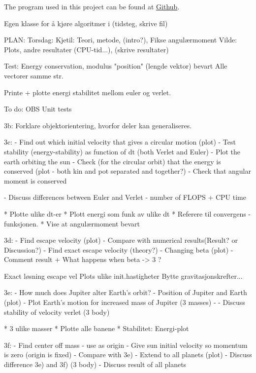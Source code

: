 


The program used in this project can be found at \href{https://github.com/kjetka/Project3}{Github}. 

  Egen klasse for å kjøre algoritmer i (tidsteg, skrive fil) 
     
PLAN:  
Torsdag: 
  Kjetil: Teori, metode, (intro?), Fikse angulærmoment 
  Vilde: Plots, andre resultater (CPU-tid...),  (skrive resultater)



Test: 		
Energy conservation, modulus "position" (lengde vektor) bevart
				Alle vectorer samme str.



	Printe + plotte energi stabilitet mellom euler og verlet.


To do:
	OBS Unit tests
	
	3b:
								Forklare objektorientering, hvorfor deler kan generaliseres. 
	
	3c: 					  
	- Find out which initial velocity that gives a circular motion (plot)
	- Test stability (energy-stability) as function of dt (both Verlet and Euler)
	- Plot the earth orbiting the sun
	- Check (for the circular orbit) that the energy is conserved (plot - both kin and pot separated and together?)
	- Check that angular moment is conserved
	
	- Discuss differences between Euler and Verlet
		- number of FLOPS + CPU time
	
	
 * Plotte ulike dt-er
 * Plott energi som funk av ulike dt
 * Referere til convergens - funksjonen.
 * Vise at angulærmoment bevart

	3d: 	
	- Find escape velocity (plot)
	 	- Compare with numerical results(Result? or Discussion?)
	- Find exact escape velocity (theory?)
	- Changing beta (plot)
		- Comment result + What happens when beta -> 3 ?
	
					  Exact løsning escape vel
								Plots ulike init.hastigheter
								Bytte gravitasjonskrefter... 
								
	3e:
	- How much does Jupiter alter Earth's orbit?
	- Position of Jupiter and Earth (plot)	
	- Plot Earth's motion for increased mass of Jupiter (3 masses)
	- 
	- Discuss stability of velocity verlet (3 body)

 * 3 ulike masser
 * Plotte alle banene
 * Stabilitet: Energi-plot

	3f:
	- Find center off mass - use as origin
	- Give sun initial velocity so momentum is zero (origin is fixed)
	- Compare with 3e)
	- Extend to all planets (plot)
	- Discuss difference 3e) and 3f) (3 body)
	- Discuss result of all planets
	
